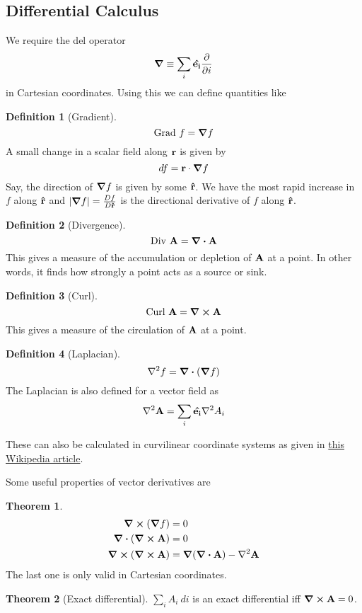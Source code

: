 \documentclass[10pt, a4paper]{extarticle}
\theoremstyle{definition}
\newtheorem{thm}{Theorem}
\newtheorem{defn}{Definition}
\begin{document}
\subsection{Differential Calculus}
We require the del operator
\[\grad\equiv \sum_i\vu{e_i}\pdv{}{i}\] in Cartesian coordinates. Using this we can define quantities like
\begin{framed}
	\begin{defn}[Gradient]
		\[\text{Grad }f=\grad f\]
		A small change in a scalar field along $\vb{r}$ is given by
		\[df=\vb{r}\cdot\grad f\]
		Say, the direction of $\grad f$ is given by some $\vu{r}$. We have the most rapid increase in $f$ along $\vu{r}$ and $|\grad f|=\frac{Df}{D\vu{r}}$ is the directional derivative of $f$ along $\vu{r}$.
	\end{defn}

	\begin{defn}[Divergence]
		\[\text{Div }\vb{A}=\div\vb{A}\]
		This gives a measure of the accumulation or depletion of $\vb{A}$ at a point. In other words, it finds how strongly a point acts as a source or sink.
	\end{defn}

	\begin{defn}[Curl]
		\[\text{Curl }\vb{A}=\curl\vb{A}\]
		This gives a measure of the circulation of $\vb{A}$ at a point.
	\end{defn}

	\begin{defn}[Laplacian]
		\[\laplacian f=\div(\grad f)\]
		The Laplacian is also defined for a vector field as
		\[\laplacian\vb{A}=\sum_i \vu{e_i}\laplacian A_i\]
	\end{defn}
\end{framed}
These can also be calculated in curvilinear coordinate systems as given in \href{https://en.wikipedia.org/wiki/Del_in_cylindrical_and_spherical_coordinates}{this Wikipedia article}. 

Some useful properties of vector derivatives are
\begin{framed}
	\begin{thm}
		\begin{align*}
			\curl(\grad f)&=0\\
			\div(\curl\vb{A})&=0\\
		\curl(\curl\vb{A})&=\grad(\div\vb{A})-\laplacian\vb{A}
		\end{align*}
		The last one is only valid in Cartesian coordinates.
	\end{thm}
\end{framed}
\begin{framed}
	\begin{thm}[Exact differential]
		$\sum_i A_i\ di$ is an exact differential iff $\curl \vb{A}=0$.
	\end{thm}
\end{framed}
\end{document}
